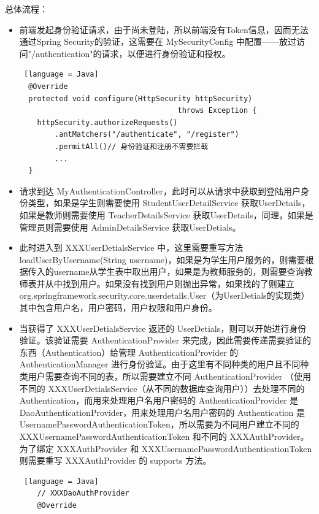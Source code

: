 \begin{enumerate}
\begin{enumerate}
\begin{itemize}
                \end{itemize}
        \end{enumerate}
        总体流程：
        \begin{itemize}
          \item 前端发起身份验证请求，由于尚未登陆，所以前端没有Token信息，因而无法通过Spring Security的验证，这需要在 MySecurityConfig 中配置——放过访问"/authentication"的请求，以便进行身份验证和授权。\begin{lstlisting} [language = Java]
  @Override
  protected void configure(HttpSecurity httpSecurity)
                                    throws Exception {
    httpSecurity.authorizeRequests()
        .antMatchers("/authenticate", "/register")
        .permitAll()// 身份验证和注册不需要拦截
        ...
  }
              \end{lstlisting}
          \item 请求到达 MyAuthenticationController，此时可以从请求中获取到登陆用户身份类型，如果是学生则需要使用 StudentUserDetailService 获取UserDetails，如果是教师则需要使用 TeacherDetailsService 获取UserDetails，同理，如果是管理员则需要使用 AdminDetailsService 获取UserDetials。
          \item 此时进入到 XXXUserDetialsService 中，这里需要重写方法 loadUserByUsername(String username)，如果是为学生用户服务的，则需要根据传入的username从学生表中取出用户，如果是为教师服务的，则需要查询教师表并从中找到用户。如果没有找到用户则抛出异常，如果找的了则建立 org.springframework.security.core.userdetails.User（为UserDetials的实现类）其中包含用户名，用户密码，用户权限和用户身份。
          \item 当获得了 XXXUserDetialsService 返还的 UserDetials，则可以开始进行身份验证。该验证需要 AuthenticationProvider 来完成，因此需要传递需要验证的东西（Authentication）给管理 AuthenticationProvider 的 AuthenticationManager 进行身份验证。由于这里有不同种类的用户且不同种类用户需要查询不同的表，所以需要建立不同 AuthenticationProvider （使用不同的 XXXUserDetialsService（从不同的数据库查询用户））去处理不同的 Authentication，而用来处理用户名用户密码的 AuthenticationProvider 是 DaoAuthenticationProvider，用来处理用户名用户密码的 Authentication 是 UsernamePasswordAuthenticationToken，所以需要为不同用户建立不同的 XXXUsernamePasswordAuthenticationToken 和不同的 XXXAuthProvider。为了绑定 XXXAuthProvider 和 XXXUsernamePasswordAuthenticationToken 则需要重写 XXXAuthProvider 的 supports 方法。
                \begin{lstlisting} [language = Java]
    // XXXDaoAuthProvider
    @Override

\end{lstlisting}
\end{itemize}
\end{enumerate}
